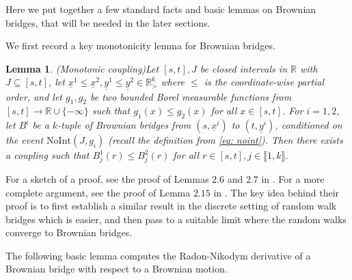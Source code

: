 \documentclass[11pt, reqno]{amsart}
\numberwithin{equation}{section}
\newcounter{dummy} \numberwithin{dummy}{section}
\newtheorem{lemma}[dummy]{Lemma}
\newcommand{\R}{\ensuremath{\mathbb{R}}}
\begin{document}
Here we put together a few standard facts and basic lemmas on Brownian bridges, that will be needed in the later sections.

We first record a key monotonicity lemma for Brownian bridges.

\begin{lemma}(Monotonic coupling)\label{lemma: bridge monotonicity}
Let $[s, t], J$ be closed intervals in $\R$ with $J \subseteq [s, t]$, let $\underline{x}^1 \le \underline{x}^2, \underline{y}^1 \le \underline{y}^2 \in \R^k_>$ where $\le$ is the coordinate-wise partial order, and let $g_1, g_2$ be two bounded Borel measurable functions from $[s,t] \to \R \cup \{-\infty\}$ such that $g_1(x)\le g_2(x)$ for all $x \in [s,t]$. For $i = 1, 2$, let $B^i$ be a $k$-tuple of Brownian bridges from $(s, \underline{x}^i)$ to $(t, \underline{y}^i)$, conditioned on the event $\mathrm{NoInt}(J, g_i)$ (recall the definition from \eqref{eq: noint}). Then there exists a coupling such that $B^1_j(r) \le B^2_j(r)$ for all $r \in [s, t], j \in \llbracket 1, k\rrbracket$.
\end{lemma}

For a sketch of a proof, see the proof of Lemmas $2.6$ and $2.7$ in \cite{corwin2014brownian}. For a more complete argument, see the proof of Lemma $2.15$ in \cite{dimitrov2021characterisation}. The key idea behind their proof is to first establish a similar result in the discrete setting of random walk bridges which is easier, and then pass to a suitable limit where the random walks converge to Brownian bridges.     

The following basic lemma computes the Radon-Nikodym derivative of a Brownian bridge with respect to a Brownian motion. 
\end{document}
